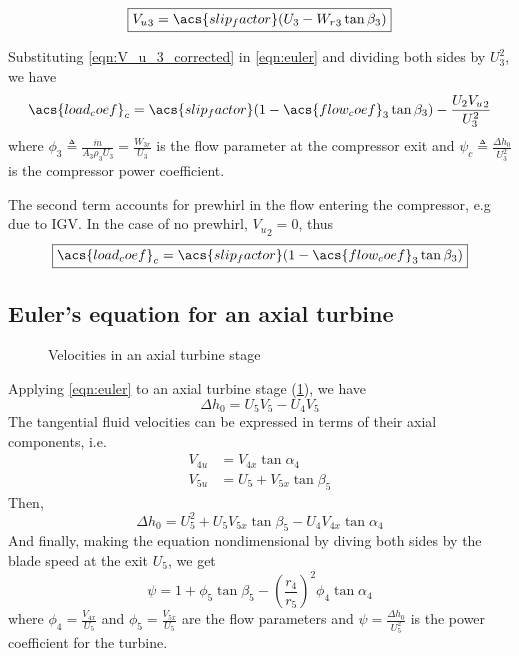 \begin{equation}
    \label{eqn:V_u_3_corrected}
    \boxed{{V_u}_3 = \acs{slip_factor}(U_3 - {W_r}_3 \tan\beta_3)}
\end{equation}

Substituting \cref{eqn:V_u_3_corrected} in \cref{eqn:euler} and dividing both sides by ${U_3^2}$, we have
\begin{equation}
    \acs{load_coef}_c = \acs{slip_factor}(1-\acs{flow_coef}_3\tan\beta_3) - \frac{U_2 {V_u}_2}{U_3^2} 
\end{equation}
where $\phi_3 \triangleq \frac{\dot{m}}{A_3 \rho_3 U_3} = \frac{W_{3r}}{U_3}$ is the flow parameter at the compressor exit
and $\psi_c \triangleq \frac{\Delta h_0}{U_3^2}$ is the compressor power coefficient.

The second term accounts for prewhirl in the flow entering the compressor, e.g due to \ac{IGV}.
In the case of no prewhirl, ${V_u}_2 = 0$, thus 
\begin{equation}
    \label{eqn:euler_compressor}
    \boxed{\acs{load_coef}_c = \acs{slip_factor}(1-\acs{flow_coef}_3\tan\beta_3)}
\end{equation}

\subsection{Euler's equation for an axial turbine}

\begin{figure}[bp]
    \caption{Velocities in an axial turbine stage}
    \label{fig:turbine_euler}
    
\end{figure}

Applying \cref{eqn:euler} to an axial turbine stage (\cref{fig:turbine_euler}), we have
\begin{equation}
    \Delta h_0 = U_5V_5-U_4V_5
\end{equation}
The tangential fluid velocities can be expressed in terms of their axial components, i.e.\
\begin{align}
    V_{4u} &= V_{4x} \tan\alpha_4 \\
    V_{5u} &= U_5 + V_{5x} \tan\beta_5
\end{align}
Then,
\begin{equation}
    \Delta h_0 = U_5^2 + U_5 V_{5x}\tan\beta_5 - U_4 V_{4x}\tan\alpha_4
\end{equation}
And finally, making the equation nondimensional by diving both sides by the blade speed at the exit $U_5$, we get
\begin{equation}
    \boxed{\psi = 1 + \phi_5\tan\beta_5-\left(\frac{r_4}{r_5}\right)^2\phi_4\tan\alpha_4}
\end{equation}
where $\phi_4 = \frac{V_{4x}}{U_5}$ and $\phi_5 = \frac{V_{5x}}{U_5}$ are the flow parameters and
$\psi=\frac{\Delta h_0}{U_5^2}$ is the power coefficient for the turbine.

